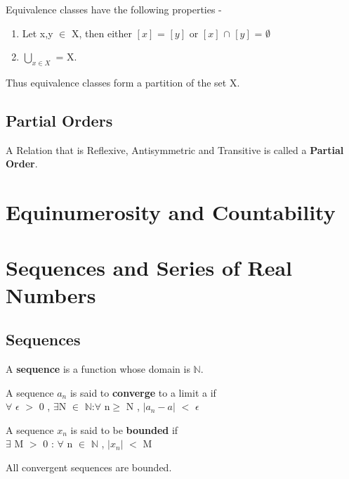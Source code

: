 \documentclass{report}
\begin{document}
Equivalence classes have the following properties - 
\begin{enumerate}
\item Let x,y $\in$ X, then either $\left[x\right]$ = $\left[y\right]$ or $\left[x\right]$ $\cap$ $\left[y\right]$ = $\emptyset$
\item $\bigcup_{x \in X}$ = X.
\end{enumerate}
Thus equivalence classes form a partition of the set X.

\section{Partial Orders}
\begin{definition}
A Relation that is Reflexive, Antisymmetric and Transitive is called a  \textbf{Partial Order}.
\end{definition}
\chapter{Equinumerosity and Countability}

\chapter{Sequences and Series of Real Numbers}
\section{Sequences}

\begin{definition}
A \textbf{sequence} is a function whose domain is $\mathbb{N}$.
\end{definition}

\begin{definition}
A sequence $a_n $ is said to \textbf{converge} to a limit a if \\
$\forall$ $\epsilon$ $>$ 0 , $\exists$N $\in$ $\mathbb{N}$:$\forall$ n$\geq$ N , $\lvert a_n - a \rvert$ $<$ $\epsilon$
\end{definition}

\begin{definition}
A sequence $x_n$ is said to be \textbf{bounded} if \\
 $\exists$ M $>$ 0 : $\forall$ n $\in$ $\mathbb{N}$ , $\lvert x_n \rvert$ $<$ M
\end{definition}

\begin{theorem}
All convergent sequences are bounded.
\end{theorem}
\end{document}
